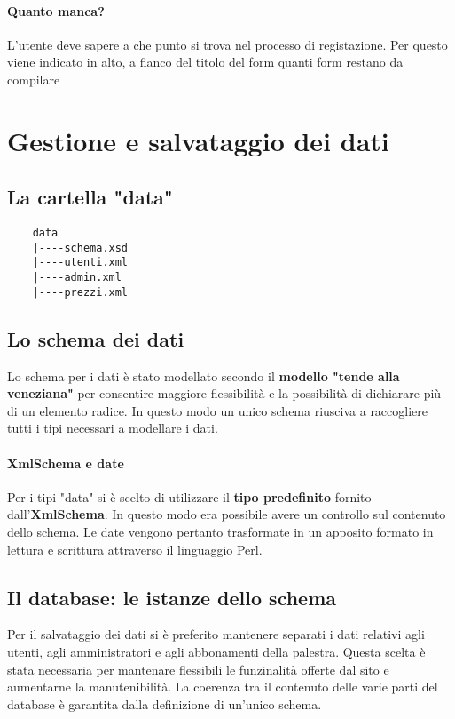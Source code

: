 \documentclass[12pt,a4paper]{article}
\begin{document}
\paragraph{Quanto manca?} L'utente deve sapere a che punto si trova nel processo di registazione. Per questo viene indicato in alto, a fianco del titolo del form quanti form restano da compilare
\section{Gestione e salvataggio dei dati}
\subsection{La cartella "data"}
\begin{center}
	\begin{lstlisting}
	data
	|----schema.xsd
	|----utenti.xml
	|----admin.xml
	|----prezzi.xml
	\end{lstlisting}
\end{center}

\subsection{Lo schema dei dati}
Lo schema per i dati è stato modellato secondo il \textbf{modello "tende alla veneziana"} per consentire maggiore flessibilità e la possibilità di dichiarare più di un elemento radice.
In questo modo un unico schema riusciva a raccogliere tutti i tipi necessari a modellare i dati.

\paragraph{XmlSchema e date} Per i tipi "data" si è scelto di utilizzare il \textbf{tipo predefinito} fornito dall'\textbf{XmlSchema}. In questo modo era possibile avere un controllo sul contenuto dello schema. Le date vengono pertanto trasformate in un apposito formato in lettura e scrittura attraverso il linguaggio Perl. 
\subsection{Il database: le istanze dello schema}
Per il salvataggio dei dati si è preferito mantenere separati i dati relativi agli utenti, agli amministratori e agli abbonamenti della palestra. 
Questa scelta è stata necessaria per mantenare flessibili le funzinalità offerte dal sito e aumentarne la manutenibilità.
La coerenza tra il contenuto delle varie parti del database è garantita dalla definizione di un'unico schema. 
\end{document}
